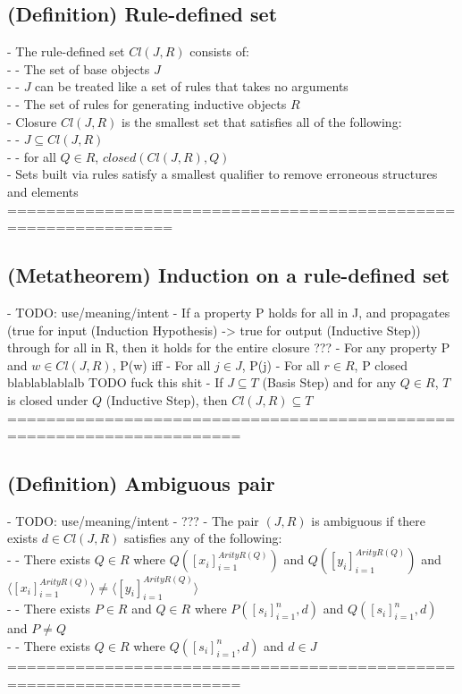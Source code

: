 \documentclass{article}
\begin{document}
\subsection{(Definition) Rule-defined set}
	- The rule-defined set $Cl(J, R)$ consists of: \\
		- - The set of base objects $J$ \\
			- - $J$ can be treated like a set of rules that takes no arguments \\
		- - The set of rules for generating inductive objects $R$ \\
	- Closure $Cl(J, R)$ is the smallest set that satisfies all of the following: \\
		- - $J \subseteq Cl(J, R)$ \\
		- - for all $Q \in R$, $closed(Cl(J, R), Q)$ \\
	- Sets built via rules satisfy a smallest qualifier to remove erroneous structures and elements \\
	===============================================================
\subsection{(Metatheorem) Induction on a rule-defined set}
	- TODO: use/meaning/intent - If a property P holds for all in J, and propagates (true for input (Induction Hypothesis) -> true for output (Inductive Step)) through for all in R, then it holds for the entire closure ???
	- For any property P and $w \in Cl(J, R)$, P(w) iff
		- For all $j \in J$, P(j)
		- For all $r \in R$, P closed blablablablalb TODO fuck this shit
	- If $J \subseteq T$ (Basis Step) and for any $Q \in R$, $T$ is closed under $Q$ (Inductive Step), then $Cl(J, R) \subseteq T$ \\
	======================================================================
\subsection{(Definition) Ambiguous pair}
	- TODO: use/meaning/intent - ???
	- The pair $(J, R)$ is ambiguous if there exists $d \in Cl(J, R)$ satisfies any of the following: \\
		- - There exists $Q \in R$ where $Q([x_i]_{i=1}^{ArityR(Q)})$ and $Q([y_i]_{i=1}^{ArityR(Q)})$ and $\langle [x_i]_{i=1}^{ArityR(Q)} \rangle \neq \langle [y_i]_{i=1}^{ArityR(Q)} \rangle$ \\
		- - There exists $P \in R$ and $Q \in R$ where $P([s_i]_{i=1}^n, d)$ and $Q([s_i]_{i=1}^n, d)$ and $P \neq Q$ \\
		- - There exists $Q \in R$ where $Q([s_i]_{i=1}^n, d)$ and $d \in J$ \\
	======================================================================
\end{document}
